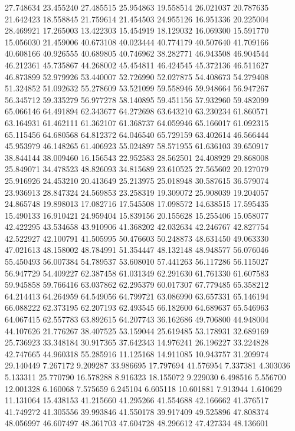 27.748634
23.455240
27.485515
25.954863
19.558514
26.021037
20.787635
21.642423
18.558845
21.759614
21.454503
24.955126
16.951336
20.225004
28.469921
17.265003
13.422303
15.454919
18.129032
16.069300
15.591770
15.056030
21.459006
40.673108
40.023444
40.774179
40.507640
41.709166
40.608166
40.926555
40.689805
40.746962
38.282771
46.943508
46.904544
46.212361
45.735867
44.268002
45.454811
46.424545
45.372136
46.511627
46.873899
52.979926
53.440007
52.726990
52.027875
54.408673
54.279408
51.324852
51.092632
55.278609
53.521099
59.558946
59.948664
56.947267
56.345712
59.335279
56.977278
58.140895
59.451156
57.932960
59.482099
65.066146
64.491894
62.343677
64.272698
63.643210
63.230234
61.860571
63.164931
61.462111
61.362107
61.368737
64.059946
65.166017
61.092315
65.115456
64.680568
64.812372
64.046540
65.729159
63.402614
46.566444
45.953979
46.148265
61.406923
55.024897
58.571955
61.636103
39.650917
38.844144
38.009460
16.156543
22.952583
28.562501
24.408929
29.868008
25.849071
34.478523
48.826093
34.815689
23.610525
27.565602
20.127079
25.916926
24.453210
20.413649
25.213975
25.018948
30.587615
36.579074
23.936913
28.847324
24.569853
23.258319
19.309072
25.908039
19.204057
24.865748
19.898013
17.082716
17.545508
17.098572
14.638515
17.595435
15.490133
16.910421
24.959404
15.839156
20.155628
15.255406
15.058077
42.422295
43.534658
43.910906
41.368202
42.032634
42.246767
42.827754
42.522927
42.100791
41.505995
50.476603
50.248873
48.631450
49.063330
47.021613
48.158002
48.784991
51.354447
48.132148
48.948577
56.076046
55.450493
56.007384
54.789537
53.608010
57.441263
56.117286
56.115027
56.947729
54.409227
62.387458
61.031349
62.291630
61.761330
61.607583
59.945858
59.766416
63.037862
62.295379
60.017307
67.779485
65.358212
64.214413
64.264959
64.549056
64.799721
63.086990
63.657331
65.146194
66.088222
62.373195
62.207193
62.493545
66.182600
64.689637
65.546963
64.067415
62.557783
63.892615
64.207743
36.162686
49.706800
44.948004
44.107626
21.776267
38.407525
53.159044
25.619485
53.178931
32.689169
25.736923
33.348184
30.917365
37.642343
14.976241
26.196227
33.224828
42.747665
44.960318
55.285916
11.125168
14.911085
10.943757
31.209974
29.140449
7.267172
9.209287
33.986695
17.797694
41.576954
7.337381
4.303036
5.133311
25.770790
16.578288
8.916323
18.155072
9.229030
6.498516
5.556700
12.001328
6.160068
7.575659
6.245104
6.605118
10.601881
7.913944
1.610629
11.131064
15.438153
41.215660
41.295266
41.554688
42.166662
41.376517
41.749272
41.305556
39.993846
41.550178
39.917409
49.525896
47.808374
48.056997
46.607497
48.361703
47.604728
48.296612
47.427334
48.136601
